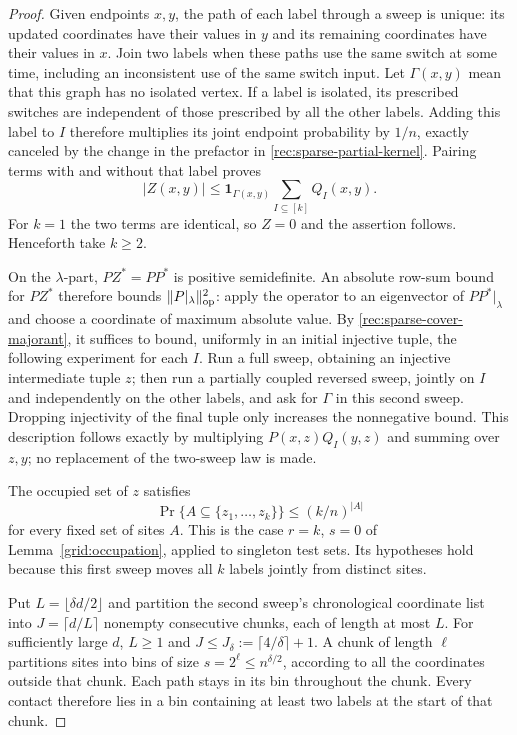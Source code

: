 \begin{proof}
Given endpoints $x,y$, the path of each label through a sweep
is unique: its updated coordinates have their values in $y$
and its remaining coordinates have their values in $x$.
Join two labels when these paths use the same switch at some
time, including an inconsistent use of the same switch input.
Let $\Gamma(x,y)$ mean that this graph has no isolated vertex.
If a label is isolated, its prescribed switches are independent
of those prescribed by all the other labels.  Adding this label
to $I$ therefore multiplies its joint endpoint probability by
$1/n$, exactly canceled by the change in the prefactor in
\eqref{rec:sparse-partial-kernel}.  Pairing terms with and
without that label proves
\begin{equation}\label{rec:sparse-cover-majorant}
 |Z(x,y)|\le\mathbf1_{\Gamma(x,y)}
                         \sum_{I\subseteq[k]}Q_I(x,y).
\end{equation}
For $k=1$ the two terms are identical, so $Z=0$ and the
assertion follows.  Henceforth take $k\ge2$.

On the $\lambda$-part, $PZ^*=PP^*$ is positive semidefinite.
An absolute row-sum bound for $PZ^*$ therefore bounds
$\|P|_\lambda\|_{\mathrm{op}}^2$: apply the operator to an eigenvector
of $PP^*|_\lambda$ and choose a coordinate of maximum
absolute value.  By \eqref{rec:sparse-cover-majorant}, it
suffices to bound, uniformly in an initial injective tuple,
the following experiment for each $I$.  Run a full sweep,
obtaining an injective intermediate tuple $z$; then run a
partially coupled reversed sweep, jointly on $I$ and
independently on the other labels, and ask for $\Gamma$ in
this second sweep.  Dropping injectivity of the final tuple
only increases the nonnegative bound.  This description
follows exactly by multiplying $P(x,z)Q_I(y,z)$ and summing
over $z,y$; no replacement of the two-sweep law is made.

The occupied set of $z$ satisfies
\begin{equation}\label{rec:chunk-intermediate-occupation}
 \Pr\{A\subseteq\{z_1,\ldots,z_k\}\}
 \le(k/n)^{|A|}
\end{equation}
for every fixed set of sites $A$.  This is the case $r=k$,
$s=0$ of Lemma~\ref{grid:occupation}, applied to singleton
test sets.  Its hypotheses hold because this first sweep
moves all $k$ labels jointly from distinct sites.

Put $L=\lfloor\delta d/2\rfloor$ and partition the second
sweep's chronological coordinate list into $J=\lceil d/L\rceil$
nonempty consecutive chunks, each of length at most $L$.
For sufficiently large $d$, $L\ge1$ and
$J\le J_\delta:=\lceil4/\delta\rceil+1$.
A chunk of length $\ell$ partitions sites into bins of size
$s=2^\ell\le n^{\delta/2}$, according to all the coordinates
outside that chunk.  Each path stays in its bin throughout
the chunk.  Every contact therefore lies in a bin containing
at least two labels at the start of that chunk.


\end{proof}
